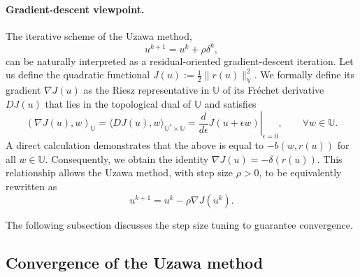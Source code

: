 \documentclass{article}
\theoremstyle{definition}
\begin{document}
\paragraph{Gradient-descent viewpoint.}
The iterative scheme of the Uzawa method,
$$u^{k+1} = u^k + \rho \delta^k,$$
can be naturally interpreted as a residual-oriented gradient-descent iteration. Let us define the quadratic functional $J(u) := \frac{1}{2}\|r(u)\|_{\mathbb{V}}^2$. We formally define its gradient $\nabla J(u)$ as the Riesz representative in $\mathbb{U}$ of its Fréchet derivative $D J(u)$ that lies in the topological dual of $\mathbb{U}$ and satisfies
$$ (\nabla J(u), w)_{\mathbb{U}} = \langle D J(u), w\rangle_{\mathbb{U}^* \times \mathbb{U}} = \left. \frac{d}{d\epsilon} J(u + \epsilon w) \right|_{\epsilon=0}, \qquad \forall w \in \mathbb{U}.$$
A direct calculation demonstrates that the above is equal to $-b(w, r(u))$ for all $w \in \mathbb{U}$. Consequently, we obtain the identity $\nabla J(u) = -\delta(r(u))$. This relationship allows the Uzawa method, with step size $\rho > 0$, to be equivalently rewritten as
$$u^{k+1} = u^k - \rho \nabla J(u^k).$$

The following subsection discusses the step size tuning to guarantee convergence.

\subsection{Convergence of the Uzawa method}
\end{document}
